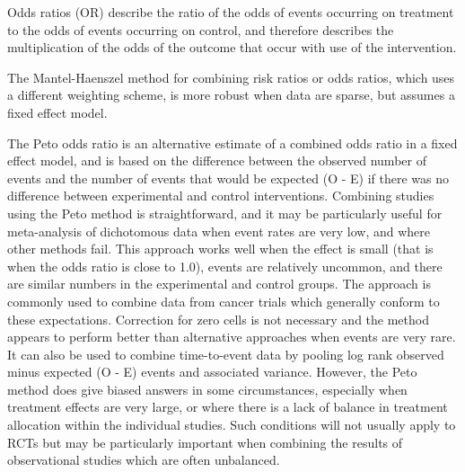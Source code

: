 \documentclass[
  10pt,
  a4paper,
  DIV=11,
  numbers=noendperiod]{scrreprt}
\begin{document}
Odds ratios (OR) describe the ratio of the odds of events occurring on
treatment to the odds of events occurring on control, and therefore
describes the multiplication of the odds of the outcome that occur with
use of the intervention.

The Mantel-Haenszel method for combining risk ratios or odds ratios,
which uses a different weighting scheme, is more robust when data are
sparse, but assumes a fixed effect model.

The Peto odds ratio is an alternative estimate of a combined odds ratio
in a fixed effect model, and is based on the difference between the
observed number of events and the number of events that would be
expected (O - E) if there was no difference between experimental and
control interventions. Combining studies using the Peto method is
straightforward, and it may be particularly useful for meta-analysis of
dichotomous data when event rates are very low, and where other methods
fail. This approach works well when the effect is small (that is when
the odds ratio is close to 1.0), events are relatively uncommon, and
there are similar numbers in the experimental and control groups. The
approach is commonly used to combine data from cancer trials which
generally conform to these expectations. Correction for zero cells is
not necessary and the method appears to perform better than alternative
approaches when events are very rare. It can also be used to combine
time-to-event data by pooling log rank observed minus expected (O - E)
events and associated variance. However, the Peto method does give
biased answers in some circumstances, especially when treatment effects
are very large, or where there is a lack of balance in treatment
allocation within the individual studies. Such conditions will not
usually apply to RCTs but may be particularly important when combining
the results of observational studies which are often unbalanced.
\end{document}
